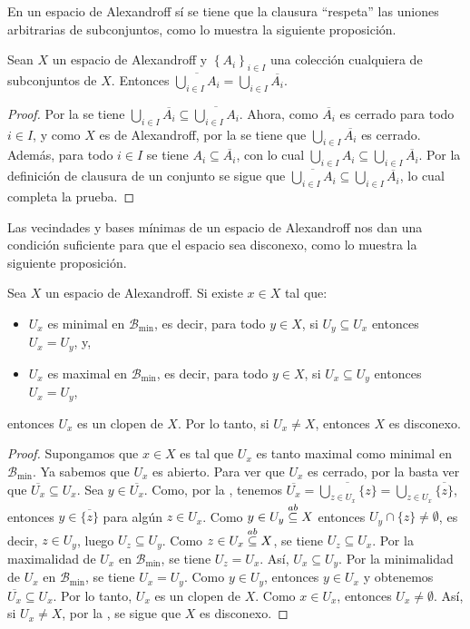 En un espacio de Alexandroff sí se tiene que la clausura ``respeta'' las uniones arbitrarias de subconjuntos, como lo muestra la siguiente proposición.
\begin{Prop}\label{Prop:Alexandroff_clausura}
   Sean $X$ un espacio de Alexandroff y $\left\{ A_i\right\}_{i\in I}$ una colección cualquiera de subconjuntos de $X$. Entonces $\overline{\bigcup_{i\in I}A_i}=\bigcup_{i\in I}\overline{A_i}$. 
\end{Prop}
\begin{proof}
   Por la  se tiene $\bigcup_{i\in I}\overline{A_i}\subseteq \overline{\bigcup_{i\in I}A_i}$. Ahora, como $\overline{A_i}$ es cerrado para todo $i\in I$, y como $X$ es de Alexandroff, por la  se tiene que $\bigcup_{i\in I}\overline{A_i}$ es cerrado. Además, para todo $i\in I$ se tiene $A_i\subseteq \overline{A_i}$, con lo cual $\bigcup_{i\in I}A_i\subseteq \bigcup_{i\in I}\overline{A_i}$. Por la definición de clausura de un conjunto se sigue que $\overline{\bigcup_{i\in I}A_i}\subseteq \bigcup_{i\in I}\overline{A_i}$, lo cual completa la prueba.
\end{proof}
Las vecindades y bases mínimas de un espacio de Alexandroff nos dan una condición suficiente para que el espacio sea disconexo, como lo muestra la siguiente proposición.
\begin{Prop}\label{Prop:Conexo_Alexandroff}
   Sea $X$ un espacio de Alexandroff. Si existe $x\in X$ tal que:
   \begin{itemize}
      \item $U_x$ es minimal en $\mathcal{B}_{\min}$, es decir, para todo $y\in X$, si $U_y\subseteq U_x$ entonces $U_x=U_y$, y,
      \item $U_x$ es maximal en $\mathcal{B}_{\min}$, es decir, para todo $y\in X$, si $U_x\subseteq U_y$ entonces $U_x=U_y$,
   \end{itemize}
   entonces $U_x$ es un clopen de $X$. Por lo tanto, si $U_x\ne X$, entonces $X$ es disconexo.
\end{Prop}
\begin{proof}
   Supongamos que $x\in X$ es tal que $U_x$ es tanto maximal como minimal en $\mathcal{B}_{\operatorname{min}}$. Ya sabemos que $U_x$ es abierto. Para ver que $U_x$ es cerrado, por la  basta ver que $\overline{U_x}\subseteq U_x$. Sea $y\in\overline{U_x}$. Como, por la , tenemos $\overline{U_x}=\overline{\bigcup_{z\in U_x}\{z\}}=\bigcup_{z\in U_x}\overline{\{z\}}$, entonces $y\in\overline{\{z\}}$ para algún $z\in U_x$. Como $y\in U_y\stackrel{ab}{\subseteq} X$ entonces $U_y\cap\{z\}\ne\emptyset$, es decir, $z\in U_y$, luego $U_z\subseteq U_y$. Como $z\in U_x\stackrel{ab}{\subseteq} X$, se tiene $U_z\subseteq U_x$. Por la maximalidad de $U_x$ en $\mathcal{B}_{\operatorname{min}}$, se tiene $U_z=U_x$. Así, $U_x\subseteq U_y$. Por la minimalidad de $U_x$ en $\mathcal{B}_{\operatorname{min}}$, se tiene $U_x=U_y$. Como $y\in U_y$, entonces $y\in U_x$ y obtenemos $\overline{U_x}\subseteq U_x$. Por lo tanto, $U_x$ es un clopen de $X$. Como $x\in U_x$, entonces $U_x\ne\emptyset$. Así, si $U_x\ne X$, por la , se sigue que $X$ es disconexo.
\end{proof}
